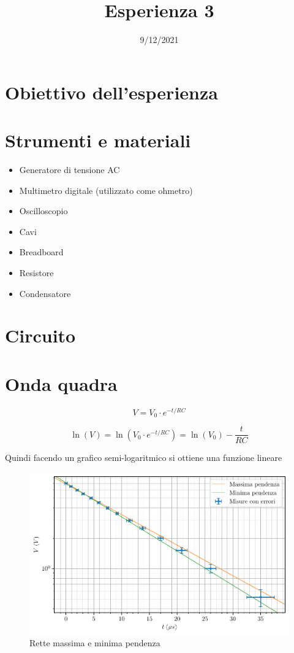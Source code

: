 \documentclass[11pt, letterpaper]{article}
\title{Esperienza 3}
\date{9/12/2021}
\author{}
\numberwithin{equation}{section} %
\begin{document}
\maketitle

\thispagestyle{empty}

\tableofcontents

\section{Obiettivo dell'esperienza}


\section{Strumenti e materiali}

\begin{itemize}
    \item Generatore di tensione AC
    \item Multimetro digitale (utilizzato come ohmetro)
    \item Oscilloscopio
    \item Cavi
    \item Breadboard
    \item Resistore
    \item Condensatore
\end{itemize}

\section{Circuito}

\section{Onda quadra}

\begin{equation}
    V = V_{0} \cdot e^{-t/RC}
\end{equation}

\[
    \ln(V) = \ln(V_{0} \cdot e^{-t/RC}) = \ln(V_{0}) - \frac{t}{RC}
\]

Quindi facendo un grafico semi-logaritmico si ottiene una funzione lineare

\begin{figure}[ht!]
    \includegraphics{onda_quadra_V(t)_pendenze.pdf}
    \caption{Rette massima e minima pendenza}
    \label{fig:onda quadra pendenze}
\end{figure}
\end{document}

